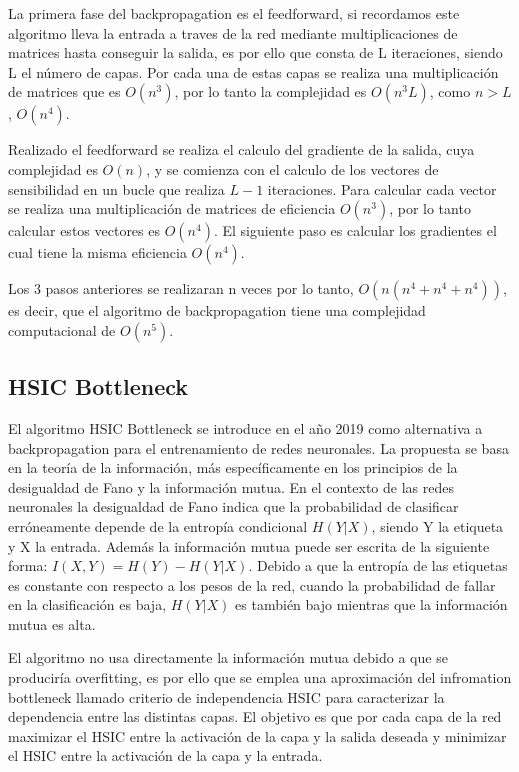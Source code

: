  La primera fase del backpropagation es el feedforward, si recordamos este algoritmo lleva la entrada a traves de la red mediante multiplicaciones de matrices hasta conseguir la salida, es por ello que consta de L iteraciones, siendo L el número de capas. Por cada una de estas capas se realiza una multiplicación de matrices que es $O(n^3)$, por lo tanto la complejidad es $O(n^3L)$, como $n>L$, $O(n^4)$.

Realizado el feedforward se realiza el calculo del gradiente de la salida, cuya complejidad es $O(n)$, y se comienza con el calculo de los vectores de sensibilidad en un bucle que realiza $L-1$ iteraciones. Para calcular cada vector se realiza una multiplicación de matrices de eficiencia $O(n^3)$, por lo tanto calcular estos vectores es $O(n^4)$. El siguiente paso es calcular los gradientes el cual tiene la misma eficiencia $O(n^4)$. 

Los 3 pasos anteriores se realizaran n veces por lo tanto, $O(n(n^4+n^4+n^4))$, es decir, que el algoritmo de backpropagation tiene una complejidad computacional de $O(n^5)$.

\subsection{HSIC Bottleneck}

El algoritmo HSIC Bottleneck se introduce en el año 2019 como alternativa a backpropagation para el entrenamiento de redes neuronales. La propuesta se basa en la teoría de la información, más específicamente en los principios de la desigualdad de Fano y la información mutua. En el contexto de las redes neuronales la desigualdad de Fano indica que la probabilidad de clasificar erróneamente depende de la entropía condicional $H(Y|X)$, siendo Y la etiqueta y X la entrada. Además la información mutua puede ser escrita de la siguiente forma: $I(X,Y) = H(Y) - H(Y|X)$. Debido a que la entropía de las etiquetas es constante con respecto a los pesos de la red, cuando la probabilidad de fallar en la clasificación es baja, $H(Y|X)$ es también bajo mientras que la información mutua es alta. 

El algoritmo no usa directamente la información mutua debido a que se produciría overfitting, es por ello que se emplea una aproximación del infromation bottleneck llamado criterio de independencia HSIC para caracterizar la dependencia entre las distintas capas. El objetivo es que por cada capa de la red maximizar el HSIC entre la activación de la capa y la salida deseada y minimizar el HSIC entre la activación de la capa y la entrada.

